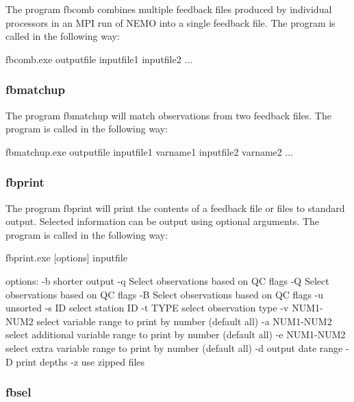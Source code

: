 \documentclass[../main/NEMO_manual]{subfiles}
\begin{document}
The program fbcomb combines multiple feedback files produced by individual processors in
an MPI run of NEMO into a single feedback file.
The program is called in the following way:

\footnotesize
\begin{cmds}
fbcomb.exe outputfile inputfile1 inputfile2 ...
\end{cmds}

\subsubsection{fbmatchup}

The program fbmatchup will match observations from two feedback files.
The program is called in the following way:

\footnotesize
\begin{cmds}
fbmatchup.exe outputfile inputfile1 varname1 inputfile2 varname2 ...
\end{cmds}

\subsubsection{fbprint}

The program fbprint will print the contents of a feedback file or files to standard output.
Selected information can be output using optional arguments.
The program is called in the following way:

\footnotesize
\begin{cmds}
fbprint.exe [options] inputfile

options:
     -b            shorter output
     -q            Select observations based on QC flags
     -Q            Select observations based on QC flags
     -B            Select observations based on QC flags
     -u            unsorted
     -s ID         select station ID  
     -t TYPE       select observation type
     -v NUM1-NUM2  select variable range to print by number 
                      (default all)
     -a NUM1-NUM2  select additional variable range to print by number 
                      (default all)
     -e NUM1-NUM2  select extra variable range to print by number 
                      (default all)
     -d            output date range
     -D            print depths
     -z            use zipped files
\end{cmds}

\subsubsection{fbsel}
\end{document}
